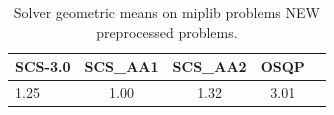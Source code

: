\begin{table}
\centering
\caption{Solver geometric means on miplib problems NEW preprocessed problems.}
\label{t-miplib problems NEW preprocessed-geom_mean}
\begin{tabular}{lcccc}
\toprule
 SCS-3.0 &  SCS\_AA1 &  SCS\_AA2 &  OSQP \\
\midrule
    1.25 &     1.00 &     1.32 &  3.01 \\
\bottomrule
\end{tabular}
\end{table}
